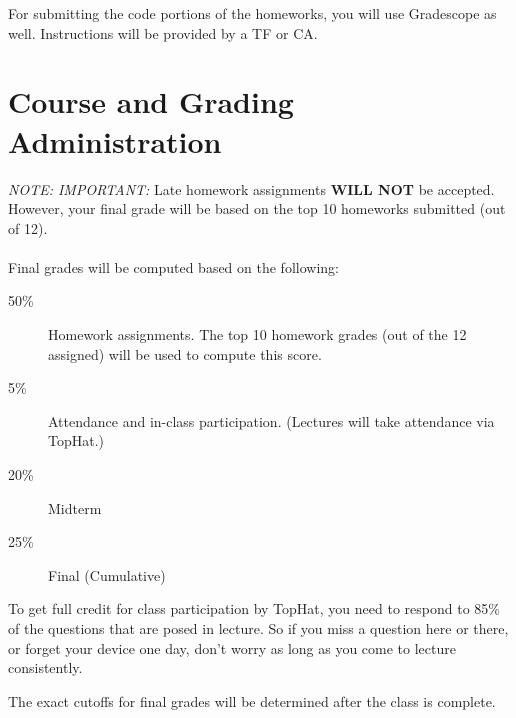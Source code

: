 \documentclass[11pt]{article}
\begin{document}
For submitting the code portions of the homeworks, you will use
Gradescope as well.  Instructions will be provided by a TF or CA.


\newpage
\section*{Course and Grading Administration}

\emph{NOTE: IMPORTANT:} Late homework assignments \textbf{WILL NOT} be
accepted. 
However, your final 
grade will be based on the top 10 homeworks submitted (out of 12).   
\\~\\
Final grades will be computed based on the following:
\begin{description}
\item[50\%] Homework assignments.  The top 10 homework grades (out of the
  12 assigned) will be used to compute this score.
\item[5\%] Attendance and in-class participation. (Lectures will take attendance via TopHat.)
\item[20\%] Midterm
\item[25\%] Final (Cumulative)
\end{description}

To get full credit for class participation by TopHat, you need to 
respond to 85\% of the questions that are posed in lecture.   So if
you miss a question here or there, or forget your device one day, don't
worry as long as you come to lecture consistently.

The exact cutoffs for final grades will be determined after the class is
complete.
\end{document}
